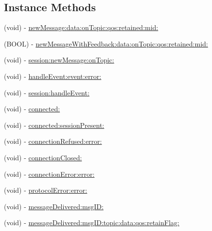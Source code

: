 \subsection*{Instance Methods}
\begin{DoxyCompactItemize}
\item 
(void) -\/ \hyperlink{protocol_m_q_t_t_session_delegate_01-p_a953cce622315d5f3072d91e52f6abf5c}{new\+Message\+:data\+:on\+Topic\+:qos\+:retained\+:mid\+:}
\item 
(B\+O\+OL) -\/ \hyperlink{protocol_m_q_t_t_session_delegate_01-p_aa96b47be7362179ca679ec1d14376ab7}{new\+Message\+With\+Feedback\+:data\+:on\+Topic\+:qos\+:retained\+:mid\+:}
\item 
(void) -\/ \hyperlink{protocol_m_q_t_t_session_delegate_01-p_aacbda6f90a303f2f1a24cc364ba0f1d5}{session\+:new\+Message\+:on\+Topic\+:}
\item 
(void) -\/ \hyperlink{protocol_m_q_t_t_session_delegate_01-p_adabd2fd2832f35d5e596b0307fe74fe3}{handle\+Event\+:event\+:error\+:}
\item 
(void) -\/ \hyperlink{protocol_m_q_t_t_session_delegate_01-p_aa308f351c7b824665fba1c6875789c1e}{session\+:handle\+Event\+:}
\item 
(void) -\/ \hyperlink{protocol_m_q_t_t_session_delegate_01-p_a01fe0f17f1c6faca6c21227203e5fd55}{connected\+:}
\item 
(void) -\/ \hyperlink{protocol_m_q_t_t_session_delegate_01-p_aee43b13ba6cecba98c5b604c8a83bbdd}{connected\+:session\+Present\+:}
\item 
(void) -\/ \hyperlink{protocol_m_q_t_t_session_delegate_01-p_a334a93246a59295ed3da062ef6c0a7fa}{connection\+Refused\+:error\+:}
\item 
(void) -\/ \hyperlink{protocol_m_q_t_t_session_delegate_01-p_a6593d68033e6a0ceb424de60c357f035}{connection\+Closed\+:}
\item 
(void) -\/ \hyperlink{protocol_m_q_t_t_session_delegate_01-p_a2c72b0bfc17acb27ce12b9f7c4b879e8}{connection\+Error\+:error\+:}
\item 
(void) -\/ \hyperlink{protocol_m_q_t_t_session_delegate_01-p_aef7d9bfd2b53c2e188a0b88554093db9}{protocol\+Error\+:error\+:}
\item 
(void) -\/ \hyperlink{protocol_m_q_t_t_session_delegate_01-p_ab96022535f3a7dce2234515ccf4259e3}{message\+Delivered\+:msg\+I\+D\+:}
\item 
(void) -\/ \hyperlink{protocol_m_q_t_t_session_delegate_01-p_a1207126b8f3bc1b24b1514e4cd0877c6}{message\+Delivered\+:msg\+I\+D\+:topic\+:data\+:qos\+:retain\+Flag\+:}

\end{DoxyCompactItemize}
